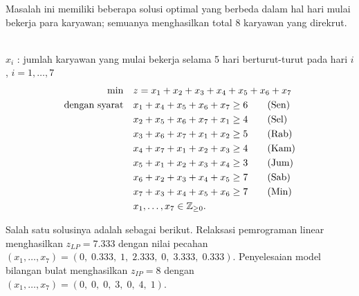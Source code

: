 \begin{solution} Masalah ini memiliki beberapa solusi optimal yang berbeda dalam hal hari mulai bekerja para karyawan; semuanya menghasilkan total 8 karyawan yang direkrut.

 \\
$x_i$ : jumlah karyawan yang mulai bekerja selama 5 hari berturut-turut pada hari $i$, $ i = 1,\dots,7$ \\
\smallskip {}
\begin{align*}
\min \quad & z = x_1 + x_2 + x_3 + x_4 + x_5 + x_6 + x_7 \\
\mbox{dengan syarat}\quad        & x_1 + x_4 + x_5 + x_6 + x_7 \ge 6   \tag{Sen} \\
& x_2 + x_5 + x_6 + x_7 + x_1 \ge 4   \tag{Sel} \\
& x_3 + x_6 + x_7 + x_1 + x_2 \ge 5   \tag{Rab} \\
& x_4 + x_7 + x_1 + x_2 + x_3 \ge 4   \tag{Kam} \\
& x_5 + x_1 + x_2 + x_3 + x_4 \ge 3   \tag{Jum} \\
& x_6 + x_2 + x_3 + x_4 + x_5 \ge 7   \tag{Sab} \\
& x_7 + x_3 + x_4 + x_5 + x_6 \ge 7   \tag{Min} \\
& x_1, \dots, x_7 \in \mathbb{Z}_{\ge 0}.
\end{align*}

Salah satu solusinya adalah sebagai berikut. Relaksasi pemrograman linear menghasilkan $z_{LP} = 7.333$ dengan nilai pecahan $(x_1, \dots, x_7) = (0,\; 0.333,\; 1,\; 2.333,\; 0,\; 3.333,\; 0.333)$. Penyelesaian model bilangan bulat menghasilkan $z_{IP} = 8$ dengan $(x_1, \dots, x_7) = (0,\; 0,\; 0,\; 3,\; 0,\; 4,\; 1)$.
\end{solution}

